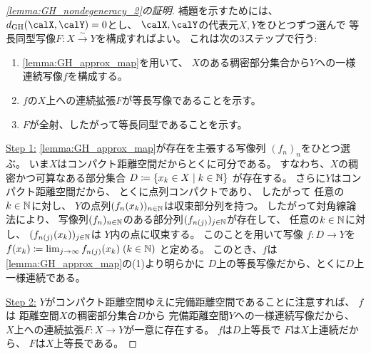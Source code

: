 \documentclass[report, notitlepage]{jlreq}
\newcommand{\GH}{\mathrm{GH}}
\begin{document}
\begin{proof}[\cref{lemma:GH_nondegeneracy_2}の証明]
    補題を示すためには、
    $d_\GH(\calX, \calY) = 0$とし、
    $\calX, \calY$の代表元$X, Y$をひとつずつ選んで
    等長同型写像$F \colon X \stackrel{\sim}{\to} Y$を構成すればよい。
    これは次の3ステップで行う:
    \begin{enumerate}[label=Step \arabic*:]
        \setlength{\leftskip}{1.5em}
        \item \cref{lemma:GH_approx_map}を用いて、
            $X$のある稠密部分集合から$Y$への一様連続写像$f$を構成する。
        \item $f$の$X$上への連続拡張$F$が等長写像であることを示す。
        \item $F$が全射、したがって等長同型であることを示す。
    \end{enumerate}

    \uline{Step 1:} \quad
    \cref{lemma:GH_approx_map}が存在を主張する写像列
    $(f_n)_n$をひとつ選ぶ。
    いま$X$はコンパクト距離空間だからとくに可分である。
    すなわち、$X$の稠密かつ可算なある部分集合
    $D \coloneqq \{ x_k \in X \mid k \in \mathbb{N} \}$
    が存在する。
    さらに$Y$はコンパクト距離空間だから、
    とくに点列コンパクトであり、
    したがって
    任意の$k \in \mathbb{N}$に対し、
    $Y$の点列$(f_n(x_k))_{n \in \mathbb{N}}$は収束部分列を持つ。
    したがって対角線論法により、
    写像列$(f_n)_{n \in \mathbb{N}}$のある部分列$(f_{n(j)})_{j \in \mathbb{N}}$が存在して、
    任意の$k \in \mathbb{N}$に対し、
    $(f_{n(j)}(x_k))_{j \in \mathbb{N}}$は
    $Y$内の点に収束する。
    このことを用いて写像
    $f \colon D \to Y$を
    $f(x_k) \coloneqq \lim_{j \to \infty} f_{n(j)}(x_k) \; (k \in \mathbb{N})$
    と定める。
    このとき、$f$は
    \cref{lemma:GH_approx_map}の(1)より明らかに
    $D$上の等長写像だから、とくに$D$上一様連続である。

    \uline{Step 2:} \quad
    $Y$がコンパクト距離空間ゆえに完備距離空間であることに注意すれば、
    $f$は
    距離空間$X$の稠密部分集合$D$から
    完備距離空間$Y$への一様連続写像だから、
    $X$上への連続拡張$F \colon X \to Y$が一意に存在する。
    $f$は$D$上等長で
    $F$は$X$上連続だから、
    $F$は$X$上等長である。


\end{proof}
\end{document}
